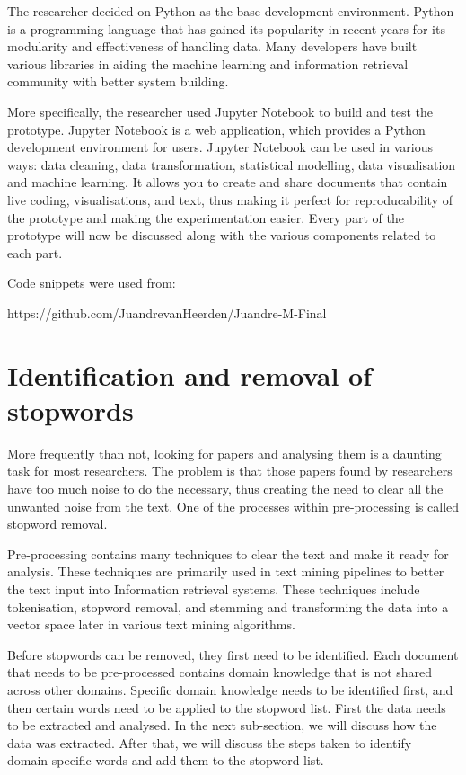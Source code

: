 The researcher decided on Python as the base development environment. Python is a programming language that has gained its popularity in recent years for its modularity and effectiveness of handling data. Many developers have built various libraries in aiding the machine learning and information retrieval community with better system building.

More specifically, the researcher used Jupyter Notebook to build and test the prototype. Jupyter Notebook is a web application, which provides a Python development environment for users. Jupyter Notebook can be used in various ways: data cleaning, data transformation, statistical modelling, data visualisation and machine learning. It allows you to create and share documents that contain live coding, visualisations, and text, thus making it perfect for reproducability of the prototype and making the experimentation easier.
Every part of the prototype will now be discussed along with the various components related to each part.

Code snippets were used from:

https://github.com/JuandrevanHeerden/Juandre-M-Final

\section{Identification and removal of stopwords} \label{ssec:pre}

More frequently than not, looking for papers and analysing them is a daunting task for most researchers. The problem is that those papers found by researchers have too much noise to do the necessary, thus creating the need to clear all the unwanted noise from the text. One of the processes within pre-processing is called stopword removal.

Pre-processing contains many techniques to clear the text and make it ready for analysis. These techniques are primarily used in text mining pipelines to better the text input into Information retrieval systems. These techniques include tokenisation, stopword removal, and stemming and transforming the data into a vector space later in various text mining algorithms.

Before stopwords can be removed, they first need to be identified. Each document that needs to be pre-processed contains domain knowledge that is not shared across other domains. Specific domain knowledge needs to be identified first, and then certain words need to be applied to the stopword list. First the data needs to be extracted and analysed. In the next sub-section, we will discuss how the data was extracted. After that, we will discuss the steps taken to identify domain-specific words and add them to the stopword list.

